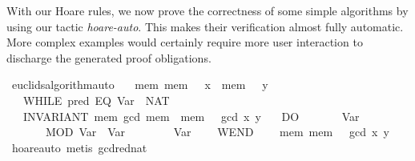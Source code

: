 \documentclass{llncs}
\begin{document}
With our Hoare rules, we now prove the correctness of some simple
algorithms by using our tactic \textit{hoare-auto}. This makes their
verification almost fully automatic. More complex examples would
certainly require more user interaction to discharge the generated
proof obligations.

\begin{isabellebody}
\isanewline
{}\isamarkupfalse%
\ euclids{}algorithm{}auto{}\isanewline
\ \ \ {}{}mem{}\ mem\ {}\ {}\ x\ {}\ mem\ {}\ {}\ y{}\ {}\isanewline
\ \ \ WHILE\ {}{}pred\ {}EQ\ {}Var\ {}{}\ {}NAT\ {}{}{}{}\isanewline
\ \ \ INVARIANT\ {}mem{}\ gcd\ {}mem\ {}{}\ {}mem\ {}{}\ {}\ gcd\ x\ y{}\isanewline
\ \ \ DO\isanewline
\ \ \ \ \ {}\ {}{}\ Var\ {}{}\isanewline
\ \ \ \ \ {}\ {}{}\ MOD\ {}Var\ {}{}\ {}Var\ {}{}{}\isanewline
\ \ \ \ \ {}\ {}{}\ Var\ {}\isanewline
\ \ \ WEND\isanewline
\ \ \ {}\ {}mem{}\ mem\ {}\ {}\ gcd\ x\ y{}{}\isanewline
%
\isadelimproof
\ \ %
\endisadelimproof
%
\isatagproof
{}\isamarkupfalse%
\ hoare{}auto\ {}metis\ gcd{}red{}nat{}%
\endisatagproof
\end{isabellebody}
\end{document}
